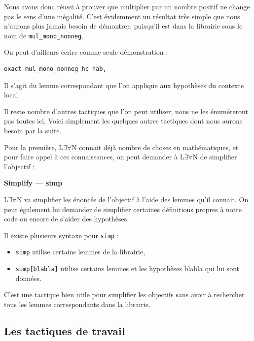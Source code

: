 \documentclass[a4paper, 11pt, twoside]{report}
\newcommand{\LEAN}{L$\exists\forall$N }
\begin{document}
\medskip

Nous avons donc réussi à prouver que multiplier par un nombre positif ne change pas le sens d'une inégalité. C'est évidemment un résultat très simple que nous n'aurons plus jamais besoin de démontrer, puisqu'il est dans la librairie sous le nom de \verb|mul_mono_nonneg|. 

On peut d'ailleurs écrire comme seule démonstration : 

\begin{lstlisting}
exact mul_mono_nonneg hc hab,
\end{lstlisting}

Il s'agit du lemme correspondant que l'on applique aux hypothèses du contexte local.

\medskip

Il reste nombre d'autres tactiques que l'on peut utiliser, nous ne les énuméreront pas toutes ici. Voici simplement les quelques autres tactiques dont nous aurons besoin par la suite.

\medskip

Pour la première, \LEAN connait déjà nombre de choses en mathématiques, et pour faire appel à ces connaissances, on peut demander à \LEAN de simplifier l'objectif :
\begin{tactic}
	\centerline{\bfseries Simplify --- simp}
	
	\LEAN va simplifier les énoncés de l'objectif à l'aide des lemmes qu'il connait. On peut également lui demander de simplifier certaines définitions propres à notre code ou encore de s'aider des hypothèses.
	
	\tcblower
	
	Il existe plusieurs syntaxe pour \verb|simp| :
	\begin{itemize}
		\item \verb|simp| utilise certains lemmes de la librairie,
		\item \verb|simp[blabla]| utilise certains lemmes et les hypothèses blabla qui lui sont données.
	\end{itemize}
\end{tactic}

C'est une tactique bien utile pour simplifier les objectifs sans avoir à rechercher tous les lemmes correspondants dans la librairie.

\subsection{Les tactiques de travail}
\end{document}
